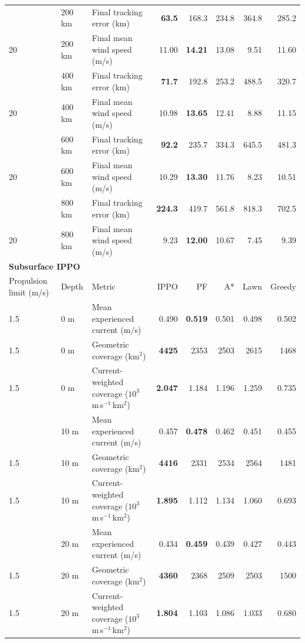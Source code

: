 \documentclass[a4paper,fleqn]{cas-dc}
\begin{document}
\begin{table}[p]
\begin{tabularx}{\textwidth}{@{}l@{\hspace{0.8em}}lXrrrrr@{}}
\addlinespace[1.0pt]
20 & 200 km & Final tracking error (km) & \textbf{63.5} & 168.3 & 234.8 & 364.8 & 285.2 \\
20 & 200 km & Final mean wind speed (m/s) & 11.00 & \textbf{14.21} & 13.08 & 9.51 & 11.60 \\
\addlinespace[1.0pt]
20 & 400 km & Final tracking error (km) & \textbf{71.7} & 192.8 & 253.2 & 488.5 & 320.7 \\
20 & 400 km & Final mean wind speed (m/s) & 10.98 & \textbf{13.65} & 12.41 & 8.88 & 11.15 \\
\addlinespace[1.0pt]
20 & 600 km & Final tracking error (km) & \textbf{92.2} & 235.7 & 334.3 & 645.5 & 481.3 \\
20 & 600 km & Final mean wind speed (m/s) & 10.29 & \textbf{13.30} & 11.76 & 8.23 & 10.51 \\
\addlinespace[1.0pt]
20 & 800 km & Final tracking error (km) & \textbf{224.3} & 419.7 & 561.8 & 818.3 & 702.5 \\
20 & 800 km & Final mean wind speed (m/s) & 9.23 & \textbf{12.00} & 10.67 & 7.45 & 9.39 \\
\midrule
\multicolumn{8}{l}{\textbf{Subsurface IPPO}}\\
Propulsion limit (m/s) & Depth & Metric & IPPO & PF & A* & Lawn & Greedy \\
\midrule
1.5 & 0 m & Mean experienced current (m/s) & 0.490 & \textbf{0.519} & 0.501 & 0.498 & 0.502 \\
1.5 & 0 m & Geometric coverage (km$^2$) & \textbf{4425} & 2353 & 2503 & 2615 & 1468 \\
1.5 & 0 m & Current-weighted coverage ($10^3$ m\,s$^{-1}$\,km$^2$) & \textbf{2.047} & 1.184 & 1.196 & 1.259 & 0.735 \\
\addlinespace[1.0pt]
1.5 & 10 m & Mean experienced current (m/s) & 0.457 & \textbf{0.478} & 0.462 & 0.451 & 0.455 \\
1.5 & 10 m & Geometric coverage (km$^2$) & \textbf{4416} & 2331 & 2534 & 2564 & 1481 \\
1.5 & 10 m & Current-weighted coverage ($10^3$ m\,s$^{-1}$\,km$^2$) & \textbf{1.895} & 1.112 & 1.134 & 1.060 & 0.693 \\
\addlinespace[1.0pt]
1.5 & 20 m & Mean experienced current (m/s) & 0.434 & \textbf{0.459} & 0.439 & 0.427 & 0.443 \\
1.5 & 20 m & Geometric coverage (km$^2$) & \textbf{4360} & 2368 & 2509 & 2503 & 1500 \\
1.5 & 20 m & Current-weighted coverage ($10^3$ m\,s$^{-1}$\,km$^2$) & \textbf{1.804} & 1.103 & 1.086 & 1.033 & 0.680 \\

\end{tabularx}
\end{table}
\end{document}
